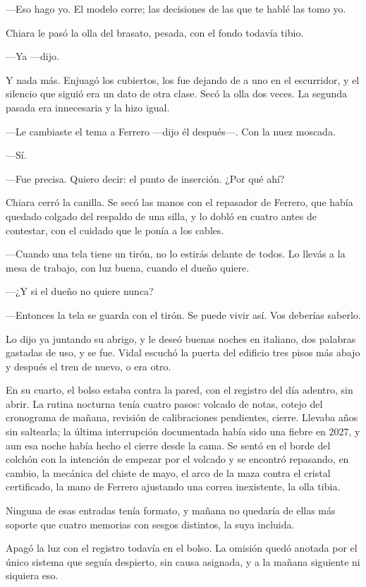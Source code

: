---Eso hago yo. El modelo corre; las decisiones de las que te hablé las tomo yo.

Chiara le pasó la olla del brasato, pesada, con el fondo todavía tibio.

---Ya ---dijo.

Y nada más. Enjuagó los cubiertos, los fue dejando de a uno en el escurridor, y el silencio que siguió era un dato de otra clase. Secó la olla dos veces. La segunda pasada era innecesaria y la hizo igual.

---Le cambiaste el tema a Ferrero ---dijo él después---. Con la nuez moscada.

---Sí.

---Fue precisa. Quiero decir: el punto de inserción. ¿Por qué ahí?

Chiara cerró la canilla. Se secó las manos con el repasador de Ferrero, que había quedado colgado del respaldo de una silla, y lo dobló en cuatro antes de contestar, con el cuidado que le ponía a los cables.

---Cuando una tela tiene un tirón, no lo estirás delante de todos. Lo llevás a la mesa de trabajo, con luz buena, cuando el dueño quiere.

---¿Y si el dueño no quiere nunca?

---Entonces la tela se guarda con el tirón. Se puede vivir así. Vos deberías saberlo.

Lo dijo ya juntando su abrigo, y le deseó buenas noches en italiano, dos palabras gastadas de uso, y se fue. Vidal escuchó la puerta del edificio tres pisos más abajo y después el tren de nuevo, o era otro.

En su cuarto, el bolso estaba contra la pared, con el registro del día adentro, sin abrir. La rutina nocturna tenía cuatro pasos: volcado de notas, cotejo del cronograma de mañana, revisión de calibraciones pendientes, cierre. Llevaba años sin saltearla; la última interrupción documentada había sido una fiebre en 2027, y aun esa noche había hecho el cierre desde la cama. Se sentó en el borde del colchón con la intención de empezar por el volcado y se encontró repasando, en cambio, la mecánica del chiste de mayo, el arco de la maza contra el cristal certificado, la mano de Ferrero ajustando una correa inexistente, la olla tibia.

Ninguna de esas entradas tenía formato, y mañana no quedaría de ellas más soporte que cuatro memorias con sesgos distintos, la suya incluida.

Apagó la luz con el registro todavía en el bolso. La omisión quedó anotada por el único sistema que seguía despierto, sin causa asignada, y a la mañana siguiente ni siquiera eso.

